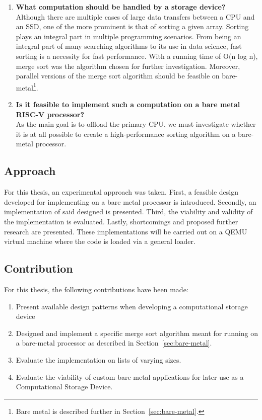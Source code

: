\begin{enumerate}
  \item {\large \textbf{What computation should be handled by a storage
    device?}}\label{sec:computational} \\
    Although there are multiple cases of large data transfers between a CPU and
    an SSD, one of the more prominent is that of sorting a given array. Sorting
    plays an integral part in multiple programming scenarios. From being an
    integral part of many searching algorithms to its use in data science, fast
    sorting is a necessity for fast performance. With a running time of O(n log
    n), merge sort was the algorithm chosen for further investigation. Moreover,
    parallel versions of the merge sort algorithm should be feasible on
    bare-metal\footnote{Bare metal is described further in
    Section~\ref{sec:bare-metal}.}.
  \item {\large \textbf{ Is it feasible to implement such a computation on a
    bare metal RISC-V processor?}} \\
    As the main goal is to offload the primary CPU, we must investigate whether
    it is at all possible to create a high-performance sorting algorithm on a
    bare-metal processor.
\end{enumerate}


\subsection{Approach}\label{sec:approach}
For this thesis, an experimental approach was taken. First, a feasible design
developed for implementing on a bare metal processor is introduced. Secondly, an
implementation of said designed is presented. Third, the viability and validity
of the implementation is evaluated. Lastly, shortcomings and proposed further
research are presented. These implementations will be carried out on a QEMU
virtual machine where the code is loaded via a general loader.

\subsection{Contribution}
For this thesis, the following contributions have been made:
\begin{enumerate}
  \item Present available design patterns when developing a computational
    storage device
  \item Designed and implement a specific merge sort algorithm meant for running on a
    bare-metal processor as described in Section~\ref{sec:bare-metal}.
  \item Evaluate the implementation on lists of varying sizes.
  \item Evaluate the viability of custom bare-metal applications for later use
    as a Computational Storage Device.
\end{enumerate}


